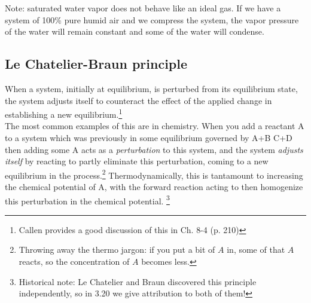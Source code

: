 \documentclass[12pt]{article}
\begin{document}
Note: saturated water vapor does not behave like an ideal gas. If we have a system of 100\% pure humid air and we compress the system, the vapor pressure of the water will remain constant and some of the water will condense. %


\subsection{Le Chatelier-Braun principle}
 When a system, initially at equilibrium, is perturbed from its equilibrium state, the system adjusts itself to counteract the effect of the applied change in establishing a new equilibrium.\footnote{Callen provides a good discussion of this in Ch. 8-4 (p. 210)}\\

The most common examples of this are in chemistry.  When you add a reactant A to a system which was previously in some equilibrium governed by
\eqs A+B \longleftrightarrow C+D\eqe
then adding some A acts as a \emph{ perturbation} to this system, and the system \emph{ adjusts itself} by reacting to partly eliminate this perturbation,
coming to a new equilibrium in the process.\footnote{Throwing away the thermo jargon: if you put a bit of $A$ in, some of that $A$ reacts, so the concentration of $A$ becomes less.} Thermodynamically, this is tantamount to increasing the chemical potential of A, with the forward reaction
acting to then homogenize this perturbation in the chemical potential. \footnote{Historical note: Le Chatelier and Braun discovered this principle independently,
so in 3.20 we give attribution to both of them!}
\end{document}
